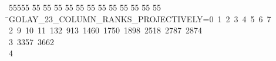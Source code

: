 %
%
\begin{tabbing}
55555 \= 55 \= 55 \= 55 \= 55 \= 55 \= 55 \= 55 \= 55 \= 55 \= 55 \= 55 \= 55 \= \>GOLAY\_23\_COLUMN\_RANKS\_PROJECTIVELY=0\ 1\ 2\ 3\ 4\ 5\ 6\ 7\ \\[0pt]
2\ 9\ 10\ 11\ 132\ 913\ 1460\ 1750\ 1898\ 2518\ 2787\ 2874\ \\[0pt]
3\ 3357\ 3662\ \\[0pt]
4\>\end{tabbing}
